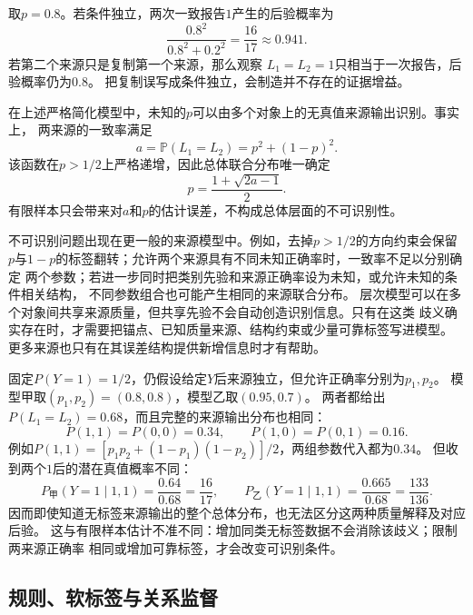 \begin{example}[独立来源与复制来源]
  \label{ex:future-source-dependence}
  取$p=0.8$。若条件独立，两次一致报告$1$产生的后验概率为
  \[
    \frac{0.8^2}{0.8^2+0.2^2}
    =
    \frac{16}{17}
    \approx0.941.
  \]
  若第二个来源只是复制第一个来源，那么观察
  $L_1=L_2=1$只相当于一次报告，后验概率仍为$0.8$。
  把复制误写成条件独立，会制造并不存在的证据增益。
\end{example}

在上述严格简化模型中，未知的\(p\)可以由多个对象上的无真值来源输出识别。事实上，
两来源的一致率满足
\[
  a
  =
  \mathbb{P}(L_1=L_2)
  =
  p^2+(1-p)^2.
\]
该函数在\(p>1/2\)上严格递增，因此总体联合分布唯一确定
\[
  p
  =
  \frac{1+\sqrt{2a-1}}{2}.
\]
有限样本只会带来对\(a\)和\(p\)的估计误差，不构成总体层面的不可识别性。

不可识别问题出现在更一般的来源模型中。例如，去掉\(p>1/2\)的方向约束会保留
\(p\)与\(1-p\)的标签翻转；允许两个来源具有不同未知正确率时，一致率不足以分别确定
两个参数；若进一步同时把类别先验和来源正确率设为未知，或允许未知的条件相关结构，
不同参数组合也可能产生相同的来源联合分布。
层次模型可以在多个对象间共享来源质量，但共享先验不会自动创造识别信息。只有在这类
歧义确实存在时，才需要把锚点、已知质量来源、结构约束或少量可靠标签写进模型。
更多来源也只有在其误差结构提供新增信息时才有帮助。

\begin{example}[相同来源输出与不同潜在解释]
  \label{ex:future-source-quality-nonidentifiability}
  固定$P(Y=1)=1/2$，仍假设给定$Y$后来源独立，但允许正确率分别为$p_1,p_2$。
  模型甲取$(p_1,p_2)=(0.8,0.8)$，模型乙取$(0.95,0.7)$。
  两者都给出$P(L_1=L_2)=0.68$，而且完整的来源输出分布也相同：
  \[
    P(1,1)=P(0,0)=0.34,\qquad
    P(1,0)=P(0,1)=0.16.
  \]
  例如$P(1,1)=[p_1p_2+(1-p_1)(1-p_2)]/2$，两组参数代入都为$0.34$。
  但收到两个$1$后的潜在真值概率不同：
  \[
    P_{\text{甲}}(Y=1\mid1,1)=\frac{0.64}{0.68}=\frac{16}{17},
    \qquad
    P_{\text{乙}}(Y=1\mid1,1)=\frac{0.665}{0.68}=\frac{133}{136}.
  \]
  因而即使知道无标签来源输出的整个总体分布，也无法区分这两种质量解释及对应后验。
  这与有限样本估计不准不同：增加同类无标签数据不会消除该歧义；限制两来源正确率
  相同或增加可靠标签，才会改变可识别条件。
\end{example}

\subsection{规则、软标签与关系监督}
\label{sec:future-rules-model-outputs-learning-objectives}


